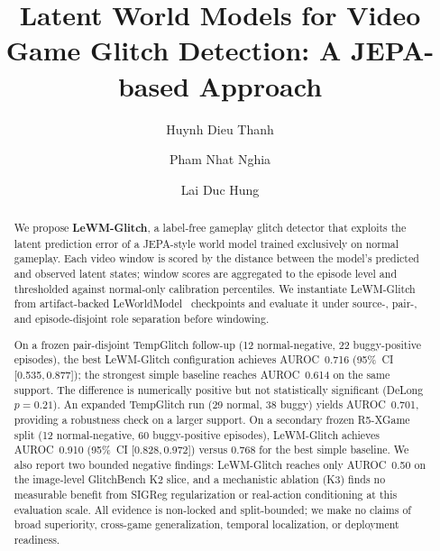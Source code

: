 \documentclass[runningheads]{llncs}
\title{Latent World Models for Video Game Glitch Detection: A JEPA-based Approach}
\author{Huynh Dieu Thanh\inst{1} \and
        Pham Nhat Nghia\inst{1} \and
        Lai Duc Hung\inst{1}}
\institute{FPT University, Ho Chi Minh City, Vietnam \\
\email{thanhhdse184021@fpt.edu.vn}}
\begin{document}
\maketitle

\begin{abstract}
We propose \textbf{LeWM-Glitch}, a label-free gameplay glitch detector that exploits the latent
prediction error of a JEPA-style world model trained exclusively on normal gameplay.
Each video window is scored by the distance between the model's predicted and observed latent
states; window scores are aggregated to the episode level and thresholded against normal-only
calibration percentiles.
We instantiate LeWM-Glitch from artifact-backed LeWorldModel~\cite{lewm} checkpoints and evaluate
it under source-, pair-, and episode-disjoint role separation before windowing.

On a frozen pair-disjoint TempGlitch follow-up (12 normal-negative, 22 buggy-positive episodes),
the best LeWM-Glitch configuration achieves AUROC~0.716 (95\%~CI [0.535,\,0.877]); the strongest
simple baseline reaches AUROC~0.614 on the same support. The difference is numerically positive
but not statistically significant (DeLong $p{=}0.21$). An expanded TempGlitch run (29 normal,
38 buggy) yields AUROC~0.701, providing a robustness check on a larger support. On a secondary
frozen R5-XGame split (12 normal-negative, 60 buggy-positive episodes), LeWM-Glitch achieves
AUROC~0.910 (95\%~CI [0.828,\,0.972]) versus 0.768 for the best simple baseline.
We also report two bounded negative findings: LeWM-Glitch reaches only AUROC~0.50 on the
image-level GlitchBench K2 slice, and a mechanistic ablation (K3) finds no measurable benefit
from SIGReg regularization or real-action conditioning at this evaluation scale.
All evidence is non-locked and split-bounded; we make no claims of broad superiority,
cross-game generalization, temporal localization, or deployment readiness.
\end{abstract}













\end{document}
